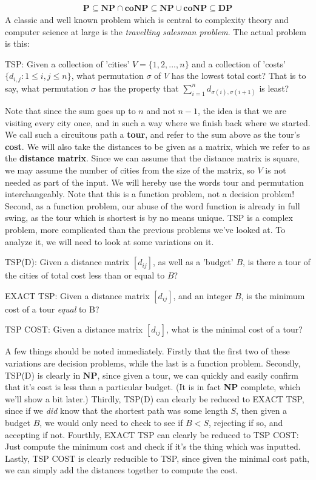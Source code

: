 \begin{align}
    \textbf{P} \subseteq \textbf{NP} \cap \textbf{coNP} \subseteq \textbf{NP} \cup \textbf{coNP} \subseteq \textbf{DP}
\end{align}
A classic and well known problem which is central to complexity theory and computer science at large is the \textit{travelling salesman problem}. The actual problem is this:
\begin{problem}
    TSP: Given a collection of 'cities' $V=\{1,2,...,n\}$ and a collection of 'costs' $\{d_{i,j}:1 \leq i,j \leq n\}$, what permutation $\sigma$ of $V$ has the lowest total cost? That is to say, what permutation $\sigma$ has the property that $\sum_{i=1}^{n} d_{\sigma(i),\sigma(i+1)}$ is least?
\end{problem}
Note that since the sum goes up to $n$ and not $n-1$, the idea is that we are visiting every city once, and in such a way where we finish back where we started. We call such a circuitous path a \textbf{tour}, and refer to the sum above as the tour's \textbf{cost}. We will also take the distances to be given as a matrix, which we refer to as the \textbf{distance matrix}. Since we can assume that the distance matrix is square, we may assume the number of cities from the size of the matrix, so $V$ is not needed as part of the input. We will hereby use the words tour and permutation interchangeably. Note that this is a function problem, not a decision problem! Second, as a function problem, our abuse of the word function is already in full swing, as the tour which is shortest is by no means unique.
TSP is a complex problem, more complicated than the previous problems we've looked at. To analyze it, we will need to look at some variations on it.
\begin{problem} 
    TSP(D): Given a distance matrix $[d_{ij}]$, as well as a 'budget' $B$, is there a tour of the cities of total cost less than or equal to $B$?
\end{problem}
\begin{problem}
    EXACT TSP: Given a distance matrix $[d_{ij}]$, and an integer $B$, is the minimum cost of a tour \textit{equal} to B?
\end{problem}
\begin{problem}
    TSP COST: Given a distance matrix $[d_{ij}]$, what is the minimal cost of a tour?
\end{problem}
A few things should be noted immediately. Firstly that the first two of these variations are decision problems, while the last is a function problem. Secondly, TSP(D) is clearly in $\textbf{NP}$, since given a tour, we can quickly and easily confirm that it's cost is less than a particular budget. (It is in fact \textbf{NP} complete, which we'll show a bit later.) Thirdly, TSP(D) can clearly be reduced to EXACT TSP, since if we \textit{did} know that the shortest path was some length $S$, then given a budget $B$, we would only need to check to see if $B < S$, rejecting if so, and accepting if not. Fourthly, EXACT TSP can clearly be reduced to TSP COST: Just compute the minimum cost and check if it's the thing which was inputted. Lastly, TSP COST is clearly reducible to TSP, since given the minimal cost path, we can simply add the distances together to compute the cost.
